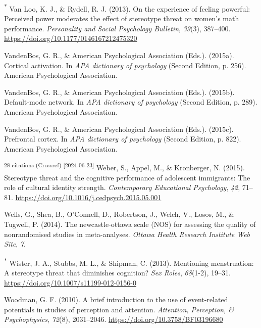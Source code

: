 \documentclass[
  stu, a4paper,floatsintext]{apa7}
\newlength{\cslhangindent}
\newenvironment{CSLReferences}[2] %
 {\begin{list}{}{%
  \setlength{\itemindent}{0pt}
  \setlength{\leftmargin}{0pt}
  \setlength{\parsep}{0pt}
  \ifodd #1
   \setlength{\leftmargin}{\cslhangindent}
   \setlength{\itemindent}{-1\cslhangindent}
  \fi
  \setlength{\itemsep}{#2\baselineskip}}}
 {\end{list}}
\begin{document}
\begin{CSLReferences}{1}{0}
\textsuperscript{*} Van Loo, K. J., \& Rydell, R. J. (2013). On the experience of feeling powerful: {Perceived} power moderates the effect of stereotype threat on women's math performance. \emph{Personality and Social Psychology Bulletin}, \emph{39}(3), 387--400. \url{https://doi.org/10.1177/0146167212475320}

VandenBos, G. R., \& American Psychological Association (Eds.). (2015a). Cortical activation. In \emph{{APA} dictionary of psychology} (Second Edition, p. 256). American Psychological Association.

VandenBos, G. R., \& American Psychological Association (Eds.). (2015b). Default-mode network. In \emph{{APA} dictionary of psychology} (Second Edition, p. 289). American Psychological Association.

VandenBos, G. R., \& American Psychological Association (Eds.). (2015c). Prefrontal cortex. In \emph{{APA} dictionary of psychology} (Second Edition, p. 822). American Psychological Association.

\textsuperscript{28 citations (Crossref) {[}2024-06-23{]}} Weber, S., Appel, M., \& Kronberger, N. (2015). Stereotype threat and the cognitive performance of adolescent immigrants: {The} role of cultural identity strength. \emph{Contemporary Educational Psychology}, \emph{42}, 71--81. \url{https://doi.org/10.1016/j.cedpsych.2015.05.001}

Wells, G., Shea, B., O'Connell, D., Robertson, J., Welch, V., Losos, M., \& Tugwell, P. (2014). The newcastle-ottawa scale ({NOS}) for assessing the quality of nonrandomised studies in meta-analyses. \emph{Ottawa Health Research Institute Web Site}, \emph{7}.

\textsuperscript{*} Wister, J. A., Stubbs, M. L., \& Shipman, C. (2013). Mentioning menstruation: A stereotype threat that diminishes cognition? \emph{Sex Roles}, \emph{68}(1-2), 19--31. \url{https://doi.org/10.1007/s11199-012-0156-0}

Woodman, G. F. (2010). A brief introduction to the use of event-related potentials in studies of perception and attention. \emph{Attention, Perception, \& Psychophysics}, \emph{72}(8), 2031--2046. \url{https://doi.org/10.3758/BF03196680}


\end{CSLReferences}
\end{document}
